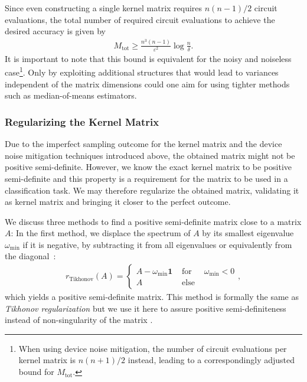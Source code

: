 \documentclass[twocolumn,superscriptaddress,nofootinbib]{revtex4-2}
\begin{document}
    Since even constructing a single kernel matrix requires $n(n-1)/2$ circuit evaluations, the total number of required circuit evaluations to achieve the desired accuracy is given by
    \begin{align}
        M_\mathrm{tot} \geq \frac{n^3(n-1)}{\varepsilon^2} \log \frac{n}{\delta}.
    \end{align}
    It is important to note that this bound is equivalent for the noisy and noiseless case\footnote{When using device noise mitigation, the number of circuit evaluations per kernel matrix is $n(n+1)/2$ instead, leading to a correspondingly adjusted bound for $M_\mathrm{tot}$.}. Only by exploiting additional structures that would lead to variances independent of the matrix dimensions could one aim for using tighter methods such as median-of-means estimators.

\subsubsection{Regularizing the Kernel Matrix}\label{sec:regularization}
Due to the imperfect sampling outcome for the kernel matrix and the device noise mitigation techniques introduced above, the obtained matrix might not be positive semi-definite.
However, we know the exact kernel matrix to be positive semi-definite and this property is a requirement for the matrix to be used in a classification task.
We may therefore regularize the obtained matrix, validating it as kernel matrix and bringing it closer to the perfect outcome.

We discuss three methods to find a positive semi-definite matrix close to a matrix $A$:
In the first method, we displace the spectrum of $A$ by its smallest eigenvalue $\omega_\mathrm{min}$ if it is negative, by subtracting it from all eigenvalues or equivalently from the diagonal~\cite{roth2004OptimalCluster}:
\begin{align}
    r_\textrm{Tikhonov}(A) = \left\{\begin{matrix} A - \omega_\mathrm{min} \mathbf{1} & \text{ for }& \omega_\mathrm{min}<0\\ A & \text{ else }&\end{matrix}\right. ,
\end{align}
which yields a positive semi-definite matrix.
This method is formally the same as \emph{Tikhonov regularization} but we use it here to assure positive semi-definiteness instead of non-singularity of the matrix \cite{Tikhonov1943}.
\end{document}
